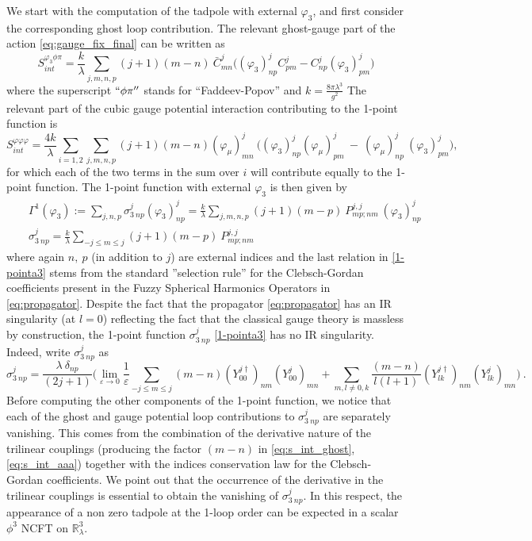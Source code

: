 \documentclass[11pt]{book}
\theoremstyle{break}
\begin{document}
We start with the computation of the tadpole with external $\varphi_3$, and first consider the corresponding ghost loop contribution. The relevant ghost-gauge part of the action \eqref{eq:gauge_fix_final} can be written as
%
\begin{equation}
S_{int}^{\varphi_3\phi\pi}=\frac{k}{\lambda}\sum_{j,m,n,p}(j+1) (m-n) \ \bar{C}^j_{mn} \bigg((\varphi_3)^j_{np}C^j_{pm}-C^j_{np}(\varphi_3)^j_{pm}\bigg) \label{eq:s_int_ghost}
\end{equation}
%
where the superscript $``\phi\pi''$ stands for ``Faddeev-Popov'' and $k=\frac{8\pi\lambda^3}{g^2}$ The relevant part of the cubic gauge potential interaction contributing to the 1-point function is
%
\begin{equation}
S_{int}^{\varphi\varphi\varphi} = \frac{4 k}{\lambda}\sum_{i=1,2}\sum_{j,m,n,p}(j+1)(m-n) (\varphi_\mu)^j_{mn} \ \bigg((\varphi_3)^j_{np}(\varphi_\mu)^j_{pm} \ - \ (\varphi_\mu)^j_{np}\ (\varphi_3)^j_{pm}\bigg) \label{eq:s_int_aaa},
\end{equation}
%
for which each of the two terms in the sum over $i$ will contribute equally to the 1-point function. The 1-point function with external $\varphi_3$ is then given by
%
\begin{eqnarray}
&& \Gamma^{1}(\varphi_3) 
:= \sum_{j,n,p}\sigma^{j}_{3\ np}(\varphi_3)^j_{np}
= \frac{k}{\lambda} \sum_{j,m,n,p}(j+1) (m-p) \ P^{j,j}_{mp;nm} \ (\varphi_3)^j_{np} \label{eq:effect_gamma_1} \\
%
&& \sigma^{j}_{3\ np}
= \frac{k}{\lambda}\sum_{-j\le m\le j} (j+1)(m-p) \ P^{j,j}_{mp;nm} 
\label{1-pointa3}
\end{eqnarray}
%
where again $n,\ p$ (in addition to $j$) are external indices and the last relation in \eqref{1-pointa3} stems from the standard ''selection rule'' for the Clebsch-Gordan coefficients present in the Fuzzy Spherical Harmonics Operators in \eqref{eq:propagator}. Despite the fact that the propagator \eqref{eq:propagator} has an IR singularity (at $l=0$) reflecting the fact that the classical gauge theory is massless by construction, the 1-point function $\sigma^{j}_{3\ np}$ \eqref{1-pointa3} has no IR singularity. Indeed, write $\sigma^{j}_{3\ np}$ as
%
\begin{equation*}
\sigma^{j}_{3\ np} = \frac{\lambda \ \delta_{np}}{(2j+1)}\bigg(\lim_{\varepsilon\to0}\frac{1}{\varepsilon}\sum_{-j\le m\le j}(m-n) (Y^{j\dag}_{00})_{nm}(Y^j_{00})_{mn} + \sum_{m,l\ne0,k}\frac{(m-n)}{l(l+1)}(Y^{j\dag}_{lk})_{nm}(Y^j_{lk})_{mn}\bigg) \ .
\end{equation*}
%
Before computing the other components of the 1-point function, we notice that each of the ghost and gauge potential loop contributions to $\sigma^{j}_{3\ np}$ are separately vanishing. This comes from the combination of the derivative nature of the trilinear couplings (producing the factor $(m-n)$ in \eqref{eq:s_int_ghost}, \eqref{eq:s_int_aaa}) together with the indices conservation law for the Clebsch-Gordan coefficients. We point out that the occurrence of the derivative in the trilinear couplings is essential to obtain the vanishing of $\sigma^{j}_{3\ np}$. In this respect, the appearance of a non zero tadpole at the 1-loop order can be expected in a scalar $\phi^3$ NCFT on $\mathbb{R}^3_\lambda$.
\end{document}
